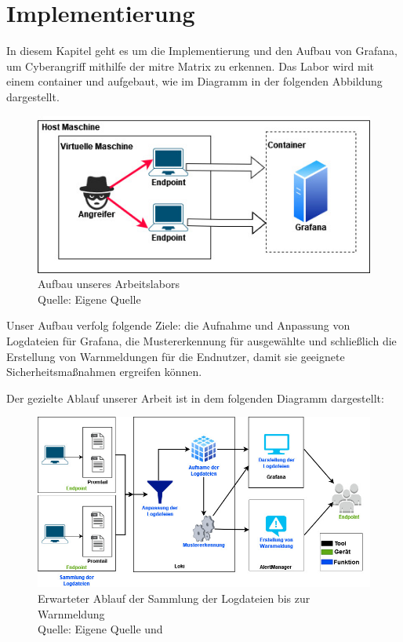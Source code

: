 \section{Implementierung}
In diesem Kapitel geht es um die Implementierung und den Aufbau von Grafana, um \gls{Cyberangriff} mithilfe der \gls{mitre} Matrix zu erkennen. Das Labor wird mit einem \gls{container} und  aufgebaut, wie im Diagramm in der folgenden Abbildung dargestellt.

\begin{figure}[H]
   \centering
   \includegraphics[width=1\textwidth]{assets/Arbeitslabor.jpg}
   \caption[Aufbau unseres Arbeitslabors]
   {Aufbau unseres Arbeitslabors \\Quelle: Eigene Quelle}
   \centering
\end{figure}

Unser Aufbau verfolg folgende Ziele: die Aufnahme und Anpassung von Logdateien für Grafana, die Mustererkennung für ausgewählte  und schließlich die Erstellung von Warnmeldungen für die Endnutzer, damit sie geeignete Sicherheitsmaßnahmen ergreifen können.

\newpage
Der gezielte Ablauf unserer Arbeit ist in dem folgenden Diagramm dargestellt:

\begin{figure}[H]
   \centering
   \includegraphics[width=1\textwidth]{assets/Ablauf_grafana2.jpg}
   \caption[Erwarteter Ablauf der Sammlung der Logdateien bis zur Warnmeldung]
   {Erwarteter Ablauf der Sammlung der Logdateien bis zur Warnmeldung \\ Quelle: Eigene Quelle und \citep{Grafana_loki}}
   \centering
\end{figure}

